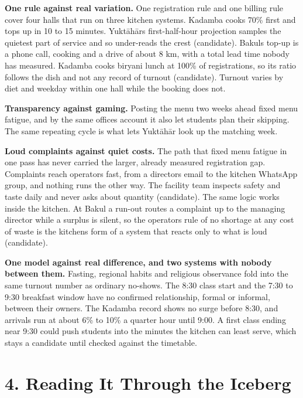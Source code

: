 \documentclass[
  10pt,
  table]{article}
\begin{document}
\textbf{One rule against real variation.} One registration rule and one billing rule cover four halls that run on three kitchen systems. Kadamba cooks 70\% first and tops up in 10 to 15 minutes. Yuktāhār\textquotesingle s first-half-hour projection samples the quietest part of service and so under-reads the crest (candidate). Bakul\textquotesingle s top-up is a phone call, cooking and a drive of about 8 km, with a total lead time nobody has measured. Kadamba cooks biryani lunch at 100\% of registrations, so its ratio follows the dish and not any record of turnout (candidate). Turnout varies by diet and weekday within one hall while the booking does not.

\textbf{Transparency against gaming.} Posting the menu two weeks ahead fixed menu fatigue, and by the same office\textquotesingle s account it also let students plan their skipping. The same repeating cycle is what lets Yuktāhār look up the matching week.

\textbf{Loud complaints against quiet costs.} The path that fixed menu fatigue in one pass has never carried the larger, already measured registration gap. Complaints reach operators fast, from a director\textquotesingle s email to the kitchen WhatsApp group, and nothing runs the other way. The facility team inspects safety and taste daily and never asks about quantity (candidate). The same logic works inside the kitchen. At Bakul a run-out routes a complaint up to the managing director while a surplus is silent, so the operator\textquotesingle s rule of no shortage at any cost of waste is the kitchen\textquotesingle s form of a system that reacts only to what is loud (candidate).

\textbf{One model against real difference, and two systems with nobody between them.} Fasting, regional habits and religious observance fold into the same turnout number as ordinary no-shows. The 8:30 class start and the 7:30 to 9:30 breakfast window have no confirmed relationship, formal or informal, between their owners. The Kadamba record shows no surge before 8:30, and arrivals run at about 6\% to 10\% a quarter hour until 9:00. A first class ending near 9:30 could push students into the minutes the kitchen can least serve, which stays a candidate until checked against the timetable.

\section{4. Reading It Through the Iceberg}\label{reading-it-through-the-iceberg}
\end{document}
